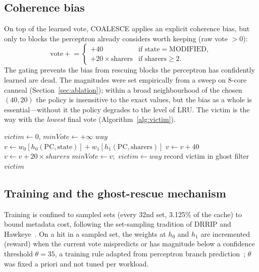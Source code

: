 \documentclass[conference]{IEEEtran}
\begin{document}
\subsection{Coherence bias}

On top of the learned vote, COALESCE applies an explicit coherence bias, but only to blocks the perceptron already considers worth keeping (raw vote $> 0$):
\begin{equation}
\mathrm{vote} \mathrel{+}=
\begin{cases}
+40 & \text{if state} = \text{MODIFIED},\\
+20 \times \mathrm{sharers} & \text{if sharers} \geq 2.
\end{cases}
\label{eq:bias}
\end{equation}
The gating prevents the bias from rescuing blocks the perceptron has confidently learned are dead. The magnitudes were set empirically from a sweep on 8-core canneal (Section~\ref{sec:ablation}); within a broad neighbourhood of the chosen $(40, 20)$ the policy is insensitive to the exact values, but the bias as a whole is essential---without it the policy degrades to the level of LRU. The victim is the way with the \emph{lowest} final vote (Algorithm~\ref{alg:victim}).

\begin{algorithm}[tbp]
\small
\caption{Victim Selection in COALESCE}
\label{alg:victim}
\begin{algorithmic}[1]
    \State $victim \gets 0$, $minVote \gets +\infty$
         \Return $way$ \EndIf
        \State $v \gets w_0[h_0(\mathrm{PC}, \mathrm{state})] + w_1[h_1(\mathrm{PC}, \mathrm{sharers})]$
             $v \gets v + 40$ \EndIf
             $v \gets v + 20 \times sharers$ \EndIf
        \EndIf
         $minVote \gets v$;\ $victim \gets way$ \EndIf
    \EndFor
     record victim in ghost filter \EndIf
    \State \Return $victim$
\EndProcedure
\end{algorithmic}
\end{algorithm}

\subsection{Training and the ghost-rescue mechanism}

Training is confined to sampled sets (every 32nd set, 3.125\% of the cache) to bound metadata cost, following the set-sampling tradition of DRRIP and Hawkeye~\cite{jaleel2010rrip,jain2016hawkeye}. On a hit in a sampled set, the weights at $h_0$ and $h_1$ are incremented (reward) when the current vote mispredicts or has magnitude below a confidence threshold $\theta = 35$, a training rule adapted from perceptron branch prediction~\cite{jimenez2001perceptron}; $\theta$ was fixed a priori and not tuned per workload.
\end{document}
